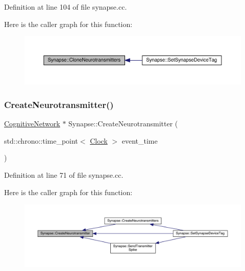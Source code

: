 Definition at line 104 of file synapse.\+cc.

Here is the caller graph for this function\+:\nopagebreak
\begin{figure}[H]
\begin{center}
\leavevmode
\includegraphics[width=350pt]{class_synapse_a97c0db103754d337e28591f185c8379f_icgraph}
\end{center}
\end{figure}
\mbox{\label{class_synapse_aef4c17534bc93b31de8e81c1ad138b7b}} 
\subsubsection{\texorpdfstring{Create\+Neurotransmitter()}{CreateNeurotransmitter()}}
{\footnotesize\ttfamily \hyperlink{class_cognitive_network}{Cognitive\+Network} $\ast$ Synapse\+::\+Create\+Neurotransmitter (\begin{DoxyParamCaption}\item[{std\+::chrono\+::time\+\_\+point$<$ \hyperlink{universe_8h_a0ef8d951d1ca5ab3cfaf7ab4c7a6fd80}{Clock} $>$}]{event\+\_\+time }\end{DoxyParamCaption})}



Definition at line 71 of file synapse.\+cc.

Here is the caller graph for this function\+:\nopagebreak
\begin{figure}[H]
\begin{center}
\leavevmode
\includegraphics[width=350pt]{class_synapse_aef4c17534bc93b31de8e81c1ad138b7b_icgraph}
\end{center}
\end{figure}
\mbox{\label{class_synapse_a593c70925fb80b880c6a01f2f252eb22}} 
